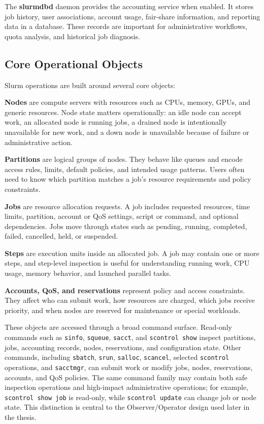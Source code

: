 The \textbf{slurmdbd} daemon provides the accounting service when enabled. It stores job history, user associations, account usage, fair-share information, and reporting data in a database. These records are important for administrative workflows, quota analysis, and historical job diagnosis.

\subsection{Core Operational Objects}

Slurm operations are built around several core objects:

\textbf{Nodes} are compute servers with resources such as CPUs, memory, GPUs, and generic resources. Node state matters operationally: an idle node can accept work, an allocated node is running jobs, a drained node is intentionally unavailable for new work, and a down node is unavailable because of failure or administrative action.

\textbf{Partitions} are logical groups of nodes. They behave like queues and encode access rules, limits, default policies, and intended usage patterns. Users often need to know which partition matches a job's resource requirements and policy constraints.

\textbf{Jobs} are resource allocation requests. A job includes requested resources, time limits, partition, account or QoS settings, script or command, and optional dependencies. Jobs move through states such as pending, running, completed, failed, cancelled, held, or suspended.

\textbf{Steps} are execution units inside an allocated job. A job may contain one or more steps, and step-level inspection is useful for understanding running work, CPU usage, memory behavior, and launched parallel tasks.

\textbf{Accounts, QoS, and reservations} represent policy and access constraints. They affect who can submit work, how resources are charged, which jobs receive priority, and when nodes are reserved for maintenance or special workloads.

These objects are accessed through a broad command surface. Read-only commands such as \texttt{sinfo}, \texttt{squeue}, \texttt{sacct}, and \texttt{scontrol show} inspect partitions, jobs, accounting records, nodes, reservations, and configuration state. Other commands, including \texttt{sbatch}, \texttt{srun}, \texttt{salloc}, \texttt{scancel}, selected \texttt{scontrol} operations, and \texttt{sacctmgr}, can submit work or modify jobs, nodes, reservations, accounts, and QoS policies. The same command family may contain both safe inspection operations and high-impact administrative operations; for example, \texttt{scontrol show job} is read-only, while \texttt{scontrol update} can change job or node state. This distinction is central to the Observer/Operator design used later in the thesis.

